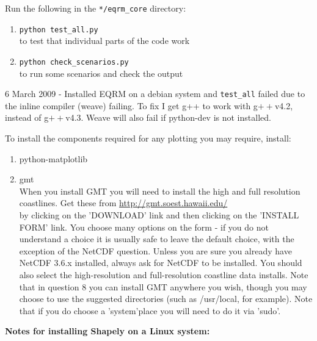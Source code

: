 \documentclass[a4paper, 12pt]{article}
\begin{document}
Run the following in the \texttt{*/eqrm\_core} directory:
\begin{enumerate}
\item \texttt{python test\_all.py} \\
to test that individual parts of the code work
\item \texttt{python check\_scenarios.py} \\
to run some scenarios and check the output
\end{enumerate}

6 March 2009 - Installed EQRM on a debian system and
\texttt{test\_all} failed due to the inline compiler (weave)
failing.  To fix I get g++ to work with g$++$v4.2, instead of
g$++$v4.3.  Weave will also fail if python-dev is not installed.

To install the components required for any plotting you may require,
install:
\begin{enumerate}
\item python-matplotlib
\item gmt \\
When you install GMT you will need to install the high and full
resolution coastlines.  Get these from
\url{http://gmt.soest.hawaii.edu/} \\
by clicking on the 'DOWNLOAD' link and then clicking on the 'INSTALL
FORM' link.  You choose many options on the form - if you do not
understand a choice it is usually safe to leave the default choice,
with the exception of the NetCDF question. Unless you are sure you
already have NetCDF 3.6.x installed, always ask for NetCDF to be
installed.  You should also select the high-resolution and
full-resolution coastline data installs.
\vspace{1em} Note that in
question 8 you can install GMT anywhere you wish, though you may
choose to use the suggested directories (such as /usr/local, for
example). Note that if you do choose a 'system'place you will need
to do it via 'sudo'.
\end{enumerate}

\textbf{Notes for installing Shapely on a Linux system:} \\
\end{document}
